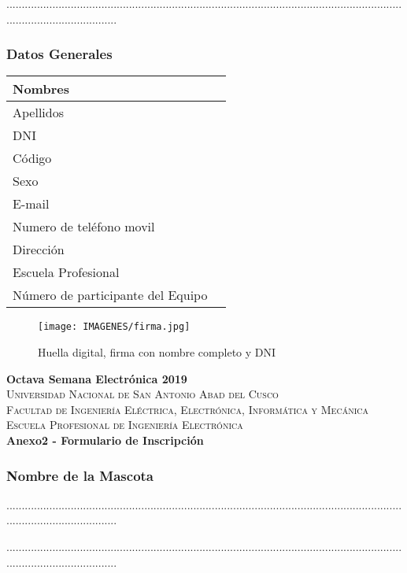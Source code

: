 \documentclass{article}
\begin{document}
.....................................................................................................................................................................


\subsubsection{Datos Generales}

\begin{tabular}{|p{5cm}|p{10cm}|}
\hline
Nombres & \\ \hline
Apellidos & \\ \hline
DNI & \\ \hline
Código & \\ \hline
Sexo & \\ \hline
E-mail & \\ \hline
Numero de teléfono movil & \\ \hline
Dirección & \\ \hline
Escuela Profesional & \\ \hline
Número de participante del Equipo & \\ \hline
\end{tabular}

\begin{figure}[hbtp]
\centering
\texttt{[image: IMAGENES/firma.jpg]}
\caption{Huella digital, firma con nombre completo y DNI}
\end{figure}

\newpage
{\center
{\Huge \bfseries Octava Semana Electrónica 2019} \\ [0.4cm]
\textsc{\LARGE  Universidad Nacional de San Antonio Abad del Cusco}\\[0.4cm] 
\textsc{\Large Facultad de Ingeniería Eléctrica, Electrónica, Informática y Mecánica}\\[0.4cm] 
\textsc{\large Escuela Profesional de Ingeniería Electrónica}\\[0.4cm]
{ \bfseries Anexo2 - Formulario de Inscripción}}

\subsubsection{Nombre de la Mascota}

.....................................................................................................................................................................

.....................................................................................................................................................................
\end{document}
